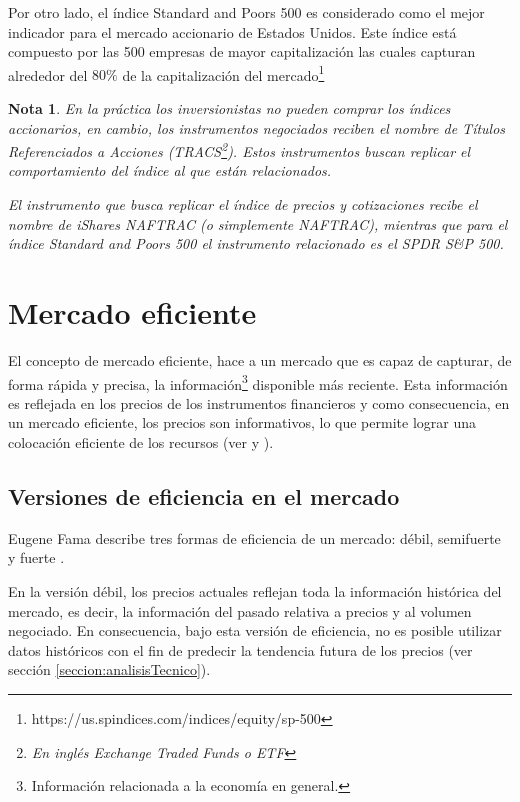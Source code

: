 \documentclass[12pt]{report}
\theoremstyle{break}
\newtheorem{nota}{Nota}[chapter]
\theoremstyle{break}
\begin{document}
Por otro lado, el índice Standard and Poors 500 es considerado como el mejor indicador para el mercado accionario de Estados Unidos. Este índice está compuesto por las 500 empresas de mayor capitalización las cuales capturan alrededor del $80\%$ de la capitalización del mercado\footnote{https://us.spindices.com/indices/equity/sp-500}

\begin{nota} \label{nota:ETF}
En la práctica los inversionistas no pueden comprar los índices accionarios, en cambio, los instrumentos negociados reciben el nombre de Títulos Referenciados a Acciones (TRACS\footnote{En inglés Exchange Traded Funds o ETF}). Estos instrumentos buscan replicar el comportamiento del índice al que están relacionados.

El instrumento que busca replicar el índice de precios y cotizaciones recibe el nombre de iShares NAFTRAC (o simplemente NAFTRAC), mientras que para el índice Standard and Poors 500 el instrumento relacionado es el SPDR S\&P 500.
\end{nota}

\section{Mercado eficiente}
\label{seccion:mercado eficiente}
El concepto de mercado eficiente, hace a un mercado que es capaz de capturar, de forma rápida y precisa, la información\footnote{Información relacionada a la economía en general.} disponible más reciente. Esta información es reflejada en los precios de los instrumentos financieros y como consecuencia, en un mercado eficiente, los precios son informativos, lo que permite lograr una colocación eficiente de los recursos (ver \cite{Fama1965} y \cite{CFA2019}).

\subsection{Versiones de eficiencia en el mercado}
\label{subseccion:versiones emh}
Eugene Fama describe tres formas de eficiencia de un mercado: débil, semifuerte y fuerte \cite{Fama1965}.

En la versión débil, los precios actuales reflejan toda la información histórica del mercado, es decir, la información del pasado relativa a precios y al volumen negociado. En consecuencia, bajo esta versión de eficiencia, no es posible utilizar datos históricos con el fin de predecir la tendencia futura de los precios (ver sección \ref{seccion:analisisTecnico}).
\end{document}
